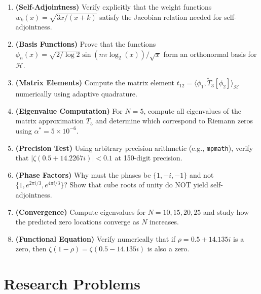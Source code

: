 \begin{enumerate}
\item \textbf{(Self-Adjointness)} Verify explicitly that the weight functions $w_k(x) = \sqrt{3x/(x+k)}$ satisfy the Jacobian relation needed for self-adjointness.

\item \textbf{(Basis Functions)} Prove that the functions $\phi_n(x) = \sqrt{2/\log 2} \sin(n\pi\log_2(x))/\sqrt{x}$ form an orthonormal basis for $\mathcal{H}$.

\item \textbf{(Matrix Elements)} Compute the matrix element $t_{12} = \langle \phi_1, \tilde{T}_3[\phi_2] \rangle_{\mathcal{H}}$ numerically using adaptive quadrature.

\item \textbf{(Eigenvalue Computation)} For $N = 5$, compute all eigenvalues of the matrix approximation $T_5$ and determine which correspond to Riemann zeros using $\alpha^* = 5 \times 10^{-6}$.

\item \textbf{(Precision Test)} Using arbitrary precision arithmetic (e.g., \texttt{mpmath}), verify that $|\zeta(0.5 + 14.2267i)| < 0.1$ at 150-digit precision.

\item \textbf{(Phase Factors)} Why must the phases be $\{1, -i, -1\}$ and not $\{1, e^{2\pi i/3}, e^{4\pi i/3}\}$? Show that cube roots of unity do NOT yield self-adjointness.

\item \textbf{(Convergence)} Compute eigenvalues for $N = 10, 15, 20, 25$ and study how the predicted zero locations converge as $N$ increases.

\item \textbf{(Functional Equation)} Verify numerically that if $\rho = 0.5 + 14.135i$ is a zero, then $\zeta(1 - \rho) = \zeta(0.5 - 14.135i)$ is also a zero.
\end{enumerate}

\section*{Research Problems}


